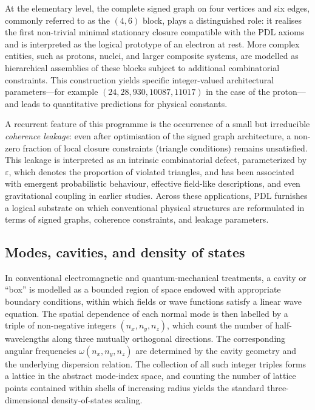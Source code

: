 \documentclass{article}
\theoremstyle{definition}
\begin{document}
At the elementary level, the complete signed graph on four vertices and six edges, commonly referred to as the $(4,6)$ block, plays a distinguished role: it realises the first non-trivial minimal stationary closure compatible with the PDL axioms and is interpreted as the logical prototype of an electron at rest.\cite{PDL_Main_2026,PDL_Intro_2026} More complex entities, such as protons, nuclei, and larger composite systems, are modelled as hierarchical assemblies of these blocks subject to additional combinatorial constraints. This construction yields specific integer-valued architectural parameters—for example $(24,28,930,10087,11017)$ in the case of the proton—and leads to quantitative predictions for physical constants.\cite{Combinatorial_Proton_v2_2026,PDL_Global_Mapping_2026}

A recurrent feature of this programme is the occurrence of a small but irreducible \emph{coherence leakage}: even after optimisation of the signed graph architecture, a non-zero fraction of local closure constraints (triangle conditions) remains unsatisfied.\cite{Topological_Reformulation_PDL_2026,Exponent_18_PDL_2026} This leakage is interpreted as an intrinsic combinatorial defect, parameterized by $\varepsilon$, which denotes the proportion of violated triangles, and has been associated with emergent probabilistic behaviour, effective field-like descriptions, and even gravitational coupling in earlier studies.\cite{Topological_Reformulation_PDL_2026,Effective_Fields_PDL_2026,Exponent_18_PDL_2026} Across these applications, PDL furnishes a logical substrate on which conventional physical structures are reformulated in terms of signed graphs, coherence constraints, and leakage parameters.

\subsection{Modes, cavities, and density of states}

In conventional electromagnetic and quantum-mechanical treatments, a cavity or “box” is modelled as a bounded region of space endowed with appropriate boundary conditions, within which fields or wave functions satisfy a linear wave equation.\cite{Density_of_states_Notes,EM_Cavities_Notes} The spatial dependence of each normal mode is then labelled by a triple of non-negative integers $(n_x,n_y,n_z)$, which count the number of half-wavelengths along three mutually orthogonal directions. The corresponding angular frequencies $\omega(n_x,n_y,n_z)$ are determined by the cavity geometry and the underlying dispersion relation.\cite{EM_Cavities_Notes,Counting_States_2021} The collection of all such integer triples forms a lattice in the abstract mode-index space, and counting the number of lattice points contained within shells of increasing radius yields the standard three-dimensional density-of-states scaling.
\end{document}
